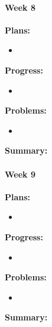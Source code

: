 \paragraph{Week 8}
\begin{adjustwidth}{2.5em}{0pt}
    \vspace{-0.5cm}\textbf{Plans:}
    \vspace{-0.5cm}
    \begin{itemize}
        \item 
    \end{itemize} 
    \vspace{-0.3cm}\textbf{Progress:}
    \vspace{-0.5cm}
    \begin{itemize}
        \item  
    \end{itemize} 
    \vspace{-0.3cm}\textbf{Problems:}
    \vspace{-0.5cm}
    \begin{itemize}
        \item 
    \end{itemize}  
    \vspace{-0.3cm}\noindent\textbf{Summary:}\\
    \noindent 
\end{adjustwidth} 

\paragraph{Week 9}
\begin{adjustwidth}{2.5em}{0pt}
    \vspace{-0.5cm}\textbf{Plans:}
    \vspace{-0.5cm}
    \begin{itemize}
        \item 
    \end{itemize} 
    \vspace{-0.3cm}\textbf{Progress:}
    \vspace{-0.5cm}
    \begin{itemize}
        \item 
    \end{itemize} 
    \vspace{-0.3cm}\textbf{Problems:}
    \vspace{-0.5cm}
    \begin{itemize}
        \item 
    \end{itemize}  
    \vspace{-0.3cm}\noindent\textbf{Summary:}\\
    \noindent 
\end{adjustwidth} 

